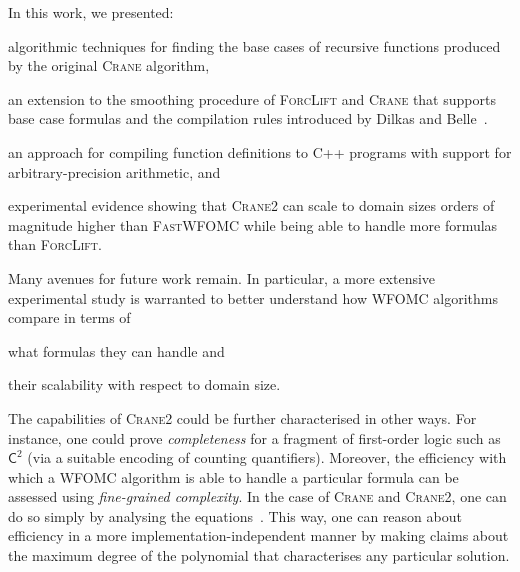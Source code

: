 \documentclass{article}
\theoremstyle{remark}
\newcommand{\Ctwo}{$\mathsf{C}^{2}$}
\newcommand{\Cranetwo}{\textsc{Crane2}}
\begin{document}
In this work, we presented:
\begin{enumerate*}[label=(\roman*)]
  \item algorithmic techniques for finding the base cases of recursive functions
  produced by the original \textsc{Crane} algorithm,
  \item an extension to the smoothing procedure of \textsc{ForcLift} and
  \textsc{Crane} that supports base case formulas and the compilation rules
  introduced by Dilkas and Belle~.
  \item an approach for compiling function definitions to C++ programs with
  support for arbitrary-precision arithmetic, and
  \item experimental evidence showing that \Cranetwo{} can scale to domain sizes
  orders of magnitude higher than \textsc{FastWFOMC} while being able to handle
  more formulas than \textsc{ForcLift}.
\end{enumerate*}

Many avenues for future work remain. In particular, a more extensive
experimental study is warranted to better understand how WFOMC algorithms
compare in terms of
\begin{enumerate*}[label=(\roman*)]
  \item what formulas they can handle and
  \item their scalability with respect to domain size.
\end{enumerate*}
The capabilities of \Cranetwo{} could be further characterised in other ways.
For instance, one could prove \emph{completeness} for a fragment of first-order
logic such as \Ctwo{} (via a suitable encoding of counting quantifiers).
Moreover, the efficiency with which a WFOMC algorithm is able to handle a
particular formula can be assessed using \emph{fine-grained complexity}. In the
case of \textsc{Crane} and \Cranetwo{}, one can do so simply by analysing the
equations~\cite{DBLP:conf/kr/DilkasB23}. This way, one can reason about
efficiency in a more implementation-independent manner by making claims about
the maximum degree of the polynomial that characterises any particular solution.



\end{document}
